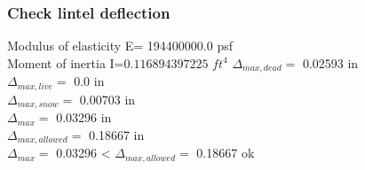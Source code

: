 
\subsubsection{Check lintel deflection }
Modulus of elasticity E=  194400000.0  psf \\
Moment of inertia I=$  0.116894397225$  $ft^4$
$\Delta_{max,dead} =$  0.02593  in \\
$\Delta_{max,live} =$  0.0  in \\
$\Delta_{max,snow} =$  0.00703  in \\
$\Delta_{max} =$  0.03296  in \\
$\Delta_{max,allowed} =$  0.18667  in \\
$\Delta_{max} =$  0.03296  < $\Delta_{max,allowed} =$  0.18667  ok \\
